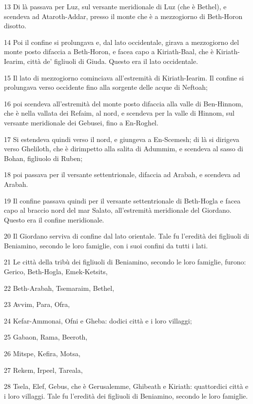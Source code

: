 \par 13 Di là passava per Luz, sul versante meridionale di Luz (che è Bethel), e scendeva ad Ataroth-Addar, presso il monte che è a mezzogiorno di Beth-Horon disotto.
\par 14 Poi il confine si prolungava e, dal lato occidentale, girava a mezzogiorno del monte posto difaccia a Beth-Horon, e facea capo a Kiriath-Baal, che è Kiriath-Iearim, città de' figliuoli di Giuda. Questo era il lato occidentale.
\par 15 Il lato di mezzogiorno cominciava all'estremità di Kiriath-Iearim. Il confine si prolungava verso occidente fino alla sorgente delle acque di Neftoah;
\par 16 poi scendeva all'estremità del monte posto difaccia alla valle di Ben-Hinnom, che è nella vallata dei Refaim, al nord, e scendeva per la valle di Hinnom, sul versante meridionale dei Gebusei, fino a En-Roghel.
\par 17 Si estendeva quindi verso il nord, e giungeva a En-Scemesh; di là si dirigeva verso Gheliloth, che è dirimpetto alla salita di Adummim, e scendeva al sasso di Bohan, figliuolo di Ruben;
\par 18 poi passava per il versante settentrionale, difaccia ad Arabah, e scendeva ad Arabah.
\par 19 Il confine passava quindi per il versante settentrionale di Beth-Hogla e facea capo al braccio nord del mar Salato, all'estremità meridionale del Giordano. Questo era il confine meridionale.
\par 20 Il Giordano serviva di confine dal lato orientale. Tale fu l'eredità dei figliuoli di Beniamino, secondo le loro famiglie, con i suoi confini da tutti i lati.
\par 21 Le città della tribù dei figliuoli di Beniamino, secondo le loro famiglie, furono: Gerico, Beth-Hogla, Emek-Ketsits,
\par 22 Beth-Arabah, Tsemaraim, Bethel,
\par 23 Avvim, Para, Ofra,
\par 24 Kefar-Ammonai, Ofni e Gheba: dodici città e i loro villaggi;
\par 25 Gabaon, Rama, Beeroth,
\par 26 Mitspe, Kefira, Motsa,
\par 27 Rekem, Irpeel, Tareala,
\par 28 Tsela, Elef, Gebus, che è Gerusalemme, Ghibeath e Kiriath: quattordici città e i loro villaggi. Tale fu l'eredità dei figliuoli di Beniamino, secondo le loro famiglie.

